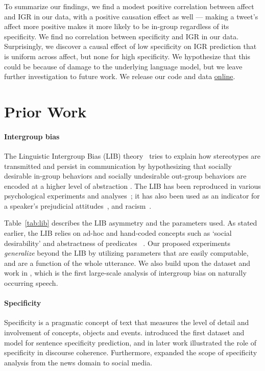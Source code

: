 To summarize our findings, we find a modest positive correlation between affect and IGR in our data, with a positive causation effect as well --- making a tweet's affect more positive makes it more likely to be in-group regardless of its specificity. We find no correlation between specificity and IGR in our data. Surprisingly, we discover a causal effect of low specificity on IGR prediction that is uniform across affect, but none for high specificity. We hypothesize that this could be because of damage to the underlying language model, but we leave further investigation to future work. We release our code and data \href{https://github.com/venkatasg/intergroup-probing}{online}.

\section{Prior Work}

\paragraph{Intergroup bias} The  Linguistic Intergroup Bias  (LIB) theory~\cite{maass_language_1989,maass_linguistic_1999} tries to explain how stereotypes are transmitted and persist in communication by hypothesizing that socially desirable in-group behaviors and socially undesirable out-group behaviors are encoded at a higher level of abstraction . The LIB has been reproduced in various psychological experiments and analyses~\cite{Anolli2006LinguisticIB, gorham_news_2006}; it has also been used as an indicator for a speaker’s prejudicial attitudes~\cite{hippel_linguistic_1997}, and racism~\cite{schnake_modern_1998}. 

Table~\ref{tab:lib} describes the LIB asymmetry and the parameters used. As stated earlier, the LIB relies on ad-hoc and hand-coded concepts such as `social desirability' and abstractness of predicates~\citep{semin_cognitive_1988} . Our proposed experiments \emph{generalize} beyond the LIB by utilizing parameters that are easily computable, and are a function of the whole utterance. We also build upon the dataset and work in \citet{govindarajan-etal-2023-people}, which is the first large-scale analysis of intergroup bias on naturally occurring speech.

\paragraph{Specificity} Specificity is a pragmatic concept of text that measures the level of detail and involvement of concepts, objects and events. \citet{louis-nenkova-2011-text} introduced the first dataset and model for sentence specificity prediction, and in later work \citet{li_discourse_2017} illustrated the role of specificity in discourse coherence. Furthermore, \citet{gao_predicting_2019} expanded the scope of specificity analysis from the news domain to social media.


